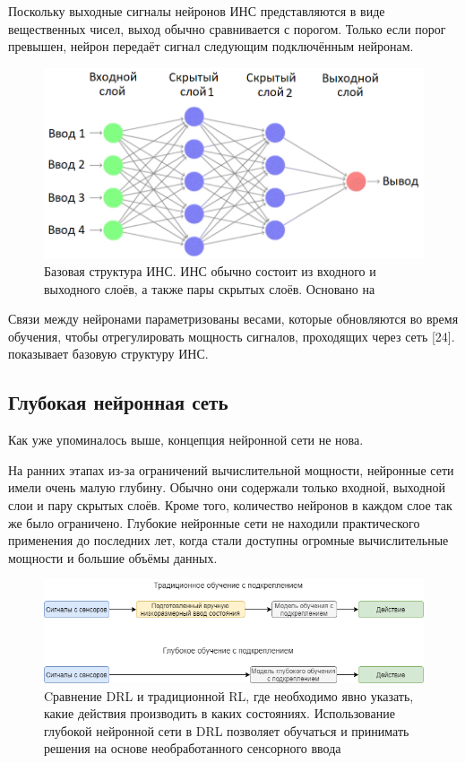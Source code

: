 Поскольку выходные сигналы нейронов ИНС представляются в виде вещественных чисел, выход обычно сравнивается с порогом. Только если порог превышен, нейрон передаёт сигнал следующим подключённым нейронам.

\begin{figure}[ht!]
	\center
	\includegraphics [scale=0.60] {my_folder/images/ch1/ANN.png}
	\caption{Базовая структура ИНС. ИНС обычно состоит из входного и выходного слоёв, а также пары скрытых слоёв. Основано на \cite{Khajanchi2003ArtificialNN} \cite{mitchell1997machine}}
	\label{fig:ch1-ANN}
\end{figure}

Связи между нейронами параметризованы весами, которые обновляются во время обучения, чтобы отрегулировать мощность сигналов, проходящих через сеть [24].  показывает базовую структуру ИНС.


\subsection{Глубокая нейронная сеть}

Как уже упоминалось выше, концепция нейронной сети не нова.

На ранних этапах из-за ограничений вычислительной мощности, нейронные сети имели очень малую глубину. Обычно они содержали только входной, выходной слои и пару скрытых слоёв. Кроме того, количество нейронов в каждом слое так же было ограничено. Глубокие нейронные сети не находили практического применения до последних лет, когда стали доступны огромные вычислительные мощности и большие объёмы данных.

\begin{figure}[ht!]
	\center
	\includegraphics [scale=0.65] {my_folder/images/ch1/DRL-flow.png}
	\caption{Cравнение DRL и традиционной RL, где необходимо явно указать, какие действия производить в каких состояниях. Использование глубокой нейронной сети в DRL позволяет обучаться и принимать решения на основе необработанного сенсорного ввода}
	\label{fig:DRL-flow}
\end{figure}

